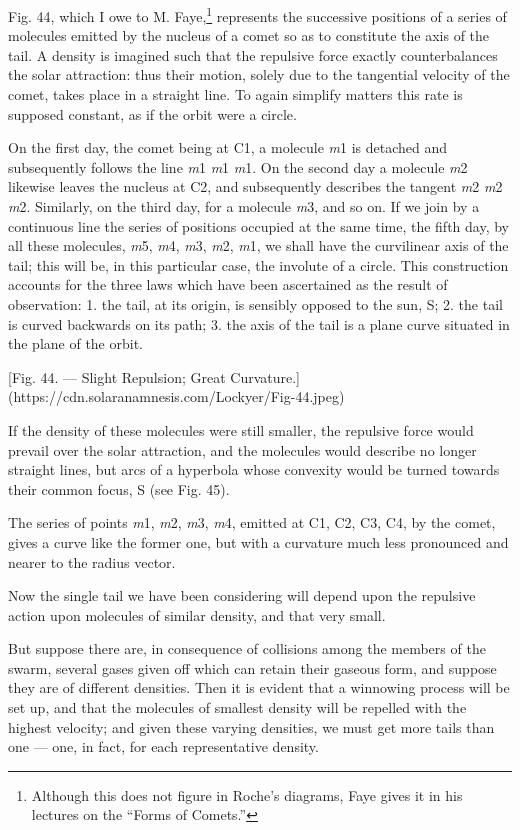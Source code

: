 \documentclass[a4paper, 12pt, oneside, polutonikogreek, english]{article}
\begin{document}
Fig. 44, which I owe to M. Faye,\footnote{Although this does not figure in Roche's diagrams, Faye gives it in his lectures on the ``Forms of Comets.''} represents the successive positions of a series of molecules emitted by the nucleus of a comet so as to constitute the axis of the tail. A density is imagined such that the repulsive force exactly counterbalances the solar attraction: thus their motion, solely due to the tangential velocity of the comet, takes place in a straight line. To again simplify matters this rate is supposed constant, as if the orbit were a circle.

On the first day, the comet being at C1, a molecule \emph{m}1 is detached and subsequently follows the line \emph{m}1 \emph{m}1 \emph{m}1. On the second day a molecule \emph{m}2 likewise leaves the nucleus at C2, and subsequently describes the tangent \emph{m}2 \emph{m}2 \emph{m}2. Similarly, on the third day, for a molecule \emph{m}3, and so on. If we join by a continuous line the series of positions occupied at the same time, the fifth day, by all these molecules, \emph{m}5, \emph{m}4, \emph{m}3, \emph{m}2, \emph{m}1, we shall have the curvilinear axis of the tail; this will be, in this particular case, the involute of a circle. This construction accounts for the three laws which have been ascertained as the result of observation: 1.
the tail, at its origin, is sensibly opposed to the sun, S; 2. the tail is curved backwards on its path; 3. the axis of the tail is a plane curve situated in the plane of the orbit.

[Fig. 44. --- Slight Repulsion; Great Curvature.](https://cdn.solaranamnesis.com/Lockyer/Fig-44.jpeg)

If the density of these molecules were still smaller, the repulsive force would prevail over the solar attraction, and the molecules would describe no longer straight lines, but arcs of a hyperbola whose convexity would be turned towards their common focus, S (see Fig. 45).

The series of points \emph{m}1, \emph{m}2, \emph{m}3, \emph{m}4, emitted at C1, C2, C3, C4, by the comet, gives a curve like the former one, but with a curvature much less pronounced and nearer to the radius vector.

Now the single tail we have been considering will depend upon the repulsive action upon molecules of similar density, and that very small.

But suppose there are, in consequence of collisions among the members of the swarm, several gases given off which can retain their gaseous form, and suppose they are of different densities. Then it is evident that a winnowing process will be set up, and that the molecules of smallest density will be repelled with the highest velocity; and given these varying densities, we must get more tails than one --- one, in fact, for each representative density.
\end{document}
